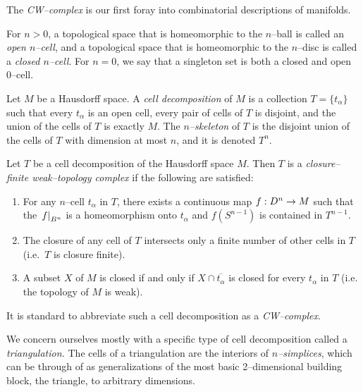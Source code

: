 The \emph{CW--complex} is our first foray into combinatorial descriptions of manifolds.

\begin{defn}
	For $n>0$, a topological space that is homeomorphic to the $n$--ball is called an \emph{open $n$--cell}, and a topological space that is homeomorphic to the $n$--disc is called a \emph{closed $n$--cell}.
	For $n=0$, we say that a singleton set is both a closed and open 0--cell.
	
	Let $M$ be a Hausdorff space.
	A \emph{cell decomposition} of $M$ is a collection $T=\{t_\alpha\}$ such that every $t_\alpha$ is an open cell, every pair of cells of $T$ is disjoint, and the union of the cells of $T$ is exactly $M$.
	The \emph{$n$--skeleton} of $T$ is the disjoint union of the cells of $T$ with dimension at most $n$, and it is denoted $T^n$.
	
	Let $T$ be a cell decomposition of the Hausdorff space $M$.
	Then $T$ is a \emph{closure--finite weak--topology complex} if the following are satisfied: 
	\begin{enumerate}
		\item For any $n$--cell $t_\alpha$ in $T$, there exists a continuous map $f:D^n\to M$ such that the $\left.f\right|_{B^n}$ is a homeomorphism onto $t_\alpha$ and $f(S^{n-1})$ is contained in $T^{n-1}$.
		\item The closure of any cell of $T$ intersects only a finite number of other cells in $T$ (i.e.\ $T$ is closure finite).
		\item A subset $X$ of $M$ is closed if and only if $X\cap \overline{t_\alpha}$ is closed for every $t_\alpha$ in $T$ (i.e. the topology of $M$ is weak).		
	\end{enumerate}
	It is standard to abbreviate such a cell decomposition as a \emph{CW--complex}.	
\end{defn}

We concern ourselves mostly with a specific type of cell decomposition called a \emph{triangulation.}
The cells of a triangulation are the interiors of \emph{$n$--simplices}, which can be through of as generalizations of the most basic 2--dimensional building block, the triangle, to arbitrary dimensions.

